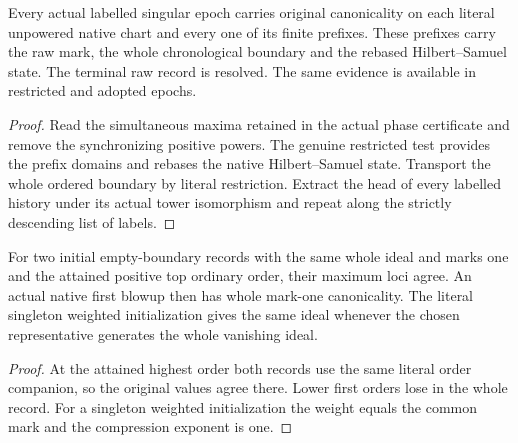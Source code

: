\begin{theorem}
\label{hir:g8-labelled-original-chart-prefixes}
\leanok
Every actual labelled singular epoch carries original
canonicality on each literal unpowered native chart and every
one of its finite prefixes. These prefixes carry the raw mark,
the whole chronological boundary and the rebased Hilbert--Samuel
state. The terminal raw record is resolved. The same evidence is
available in restricted and adopted epochs.
\end{theorem}
\begin{proof}
Read the simultaneous maxima retained in the actual phase
certificate and remove the synchronizing positive powers.
The genuine restricted test provides the prefix domains and
rebases the native Hilbert--Samuel state. Transport the whole
ordered boundary by literal restriction. Extract the head
of every labelled history under its actual tower isomorphism
and repeat along the strictly descending list of labels.
\end{proof}

\begin{theorem}
\label{hir:g8-initial-common-ideal-maximum}
\leanok
For two initial empty-boundary records with the same
whole ideal and marks one and the attained positive top
ordinary order, their maximum loci agree. An actual native
first blowup then has whole mark-one canonicality. The literal
singleton weighted initialization gives the same ideal whenever
the chosen representative generates the whole vanishing ideal.
\end{theorem}
\begin{proof}
At the attained highest order both records use the same
literal order companion, so the original values agree there.
Lower first orders lose in the whole record. For a singleton
weighted initialization the weight equals the common mark and
the compression exponent is one.
\end{proof}

